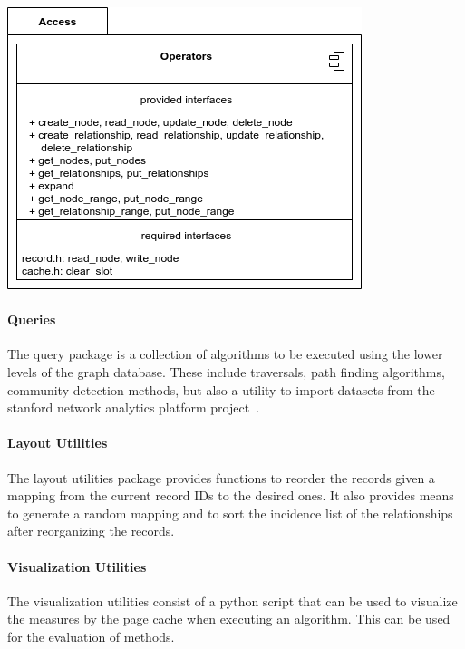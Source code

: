         \begin{center}
         \includegraphics[keepaspectratio, width=\textwidth, height=0.3\textheight]{img/access_arch.png} \\
        \end{center}

            
    \paragraph{Queries}
        The query package is a collection of algorithms to be executed using the lower levels of the graph database. These include traversals, path finding algorithms, community detection methods, but also a utility to import datasets from the stanford network analytics platform project~\autocite{snap}.
        
    \paragraph{Layout Utilities}
    The layout utilities package provides functions to reorder the records given a mapping from the current record IDs to the desired ones. It also provides means to generate a random mapping and to sort the incidence list of the relationships after reorganizing the records.
    
    \paragraph{Visualization Utilities}
    The visualization utilities consist of a python script that can be used to visualize the measures by the page cache when executing an algorithm. This can be used for the evaluation of methods.
    
